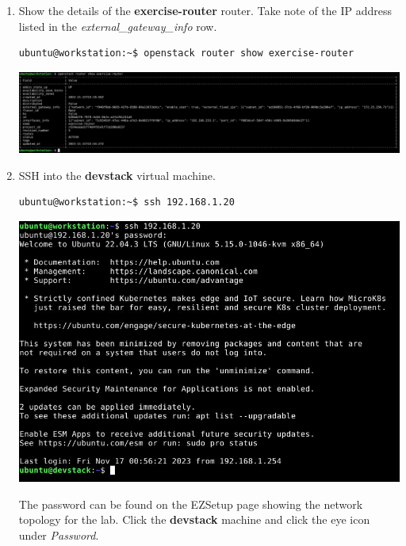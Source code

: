 \documentclass[letterpaper, 12pt]{article}
\begin{document}
\begin{enumerate}
    \item Show the details of the \textbf{exercise-router} router. Take note of the IP address listed in the
    \textit{external\_gateway\_info} row.
\begin{lstlisting}
ubuntu@workstation:~$ openstack router show exercise-router
\end{lstlisting}

    \begin{center}
        \includegraphics[width=\linewidth]{images/part2/step16.png}
    \end{center}

    \item SSH into the \textbf{devstack} virtual machine.
\begin{lstlisting}
ubuntu@workstation:~$ ssh 192.168.1.20
\end{lstlisting}

    \begin{center}
        \includegraphics[width=\linewidth]{images/part2/step17.png}
    \end{center}

    \begin{tipbox}
        The password can be found on the EZSetup page showing the network topology for the lab. Click the
        \textbf{devstack} machine and click the eye icon under \textit{Password}.
    \end{tipbox}


\end{enumerate}
\end{document}
